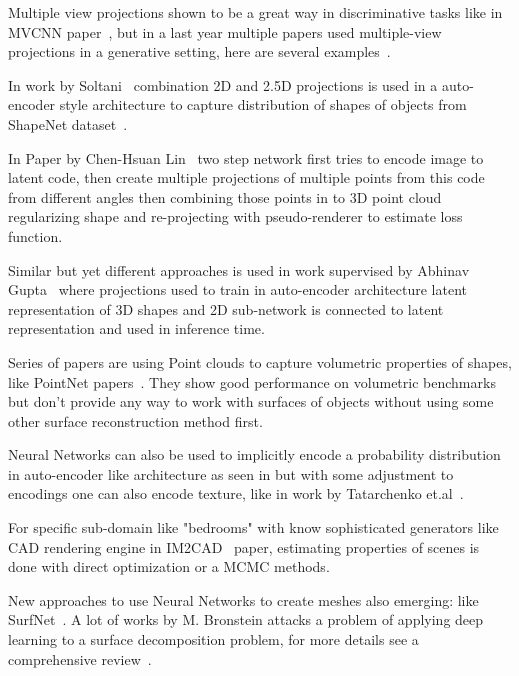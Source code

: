 Multiple view projections shown to be a great way in discriminative tasks like in MVCNN paper~\cite{su15mvcnn}, but in a last year multiple papers used multiple-view projections in a generative setting, here are several examples~\cite{Soltani_2017_CVPR,girdhar2016learning,lin2017learning,Ulusoy_2017_CVPR,tatarchenko2016multi}.

In work by Soltani~\cite{Soltani_2017_CVPR} combination 2D and 2.5D projections is used in a auto-encoder style architecture to capture distribution of shapes of objects from ShapeNet dataset~\cite{chang2015shapenet}.

In Paper by Chen-Hsuan Lin~\cite{lin2017learning} two step network first tries to encode image to latent code, then create multiple projections of multiple points from this code from different angles then combining those points in to 3D point cloud regularizing shape and re-projecting with pseudo-renderer to estimate loss function.

Similar but yet different approaches is used in work supervised by Abhinav Gupta~\cite{girdhar2016learning} where projections used to train in auto-encoder architecture latent representation of 3D shapes and 2D sub-network is connected to latent representation and used in inference time.

Series of papers are using Point clouds to capture volumetric properties of shapes, like PointNet papers~\cite{qi2016pointnet,qi2017pointnet++}. They show good performance on volumetric benchmarks but don't provide any way to work with surfaces of objects without using some other surface reconstruction method first.

Neural Networks can also be used to implicitly encode a probability distribution in auto-encoder like architecture as seen in \cite{dai2016shape,kulkarni2015deep,gwak2017weakly} but with some adjustment to encodings one can also encode texture, like in work by Tatarchenko et.al~\cite{tatarchenko2016multi}.

For specific sub-domain like "bedrooms" with know sophisticated generators like CAD rendering engine in IM2CAD~\cite{izadinia2017im2cad} paper, estimating properties of scenes is done with direct optimization or a MCMC methods. 

New approaches to use Neural Networks to create meshes also emerging: like SurfNet~\cite{Sinha_2017_CVPR}. A lot of works by M. Bronstein attacks a problem of applying deep learning to a surface decomposition problem, for more details see a comprehensive review~\cite{2016arXiv161108097B}.

